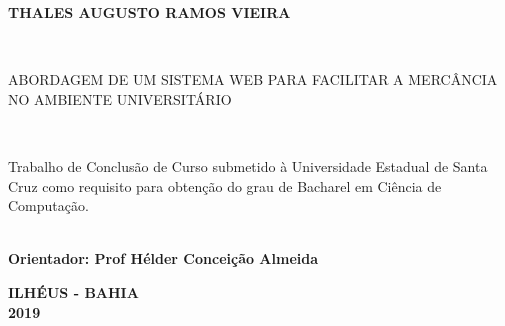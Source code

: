 
\begin{center}

    {\large \begin{large} \bfseries THALES AUGUSTO RAMOS VIEIRA \end{large}\\}
    \vspace{8cm}
    {\large\bfseries{\begin{large}ABORDAGEM DE UM SISTEMA WEB PARA FACILITAR A MERCÂNCIA NO AMBIENTE UNIVERSITÁRIO \end{large}}\\}
    \vspace{1cm}
    \hspace{.45\linewidth}
    \begin{minipage}{.50\linewidth}

    Trabalho de Conclusão de Curso submetido à Universidade Estadual de Santa Cruz como requisito para obtenção do grau de Bacharel em Ciência de Computação. 

            \textbf{\\ Orientador: Prof Hélder Conceição Almeida}
           
    
    \end{minipage}

    \vspace{2cm}
    \vfill
    {\large\bfseries{ ILHÉUS - BAHIA \\ 2019}}
\end{center}

